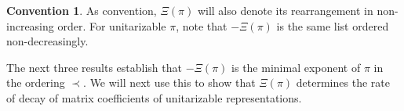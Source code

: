\documentclass{amsart}
\newcommand{\mc}[1]{\mathcal{#1}}
\newcommand{\GL}{\mathrm{GL}}
\newcommand{\1}{\m 1}
\newtheorem{lem}[thm]{Lemma}
\theoremstyle{remark}
\theoremstyle{definition}
\newtheorem{conv}[thm]{Convention}
\numberwithin{equation}{subsection}
\begin{document}
\begin{conv}
As convention, $\Xi(\pi)$ will also denote its rearrangement in non-increasing order. For unitarizable $\pi$, note that $-\Xi(\pi)$ is the same list ordered non-decreasingly.  
\end{conv}






The next three results establish that $-\Xi(\pi)$ %
is the minimal exponent of $\pi$ in the ordering $\prec$. We will next use this to show that $\Xi(\pi)$ determines the rate of decay of matrix coefficients of unitarizable representations. 

\end{document}
